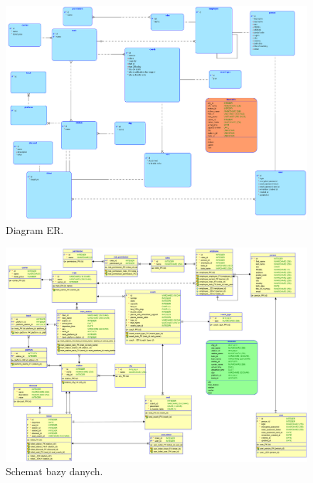 \begin{figure}
    \includegraphics[scale=0.35]{logical.png}
    \caption{Diagram ER.}
\end{figure}

\begin{figure}
    \includegraphics[scale=0.215]{relational.png}
    \caption{Schemat bazy danych.}
\end{figure}


